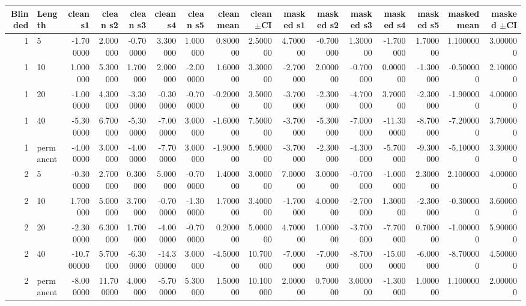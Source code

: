 \begin{tabular}{rlrrrrrrrrrrrrrr}
\toprule
Blinded & Length & clean s1 & clean s2 & clean s3 & clean s4 & clean s5 & clean mean & clean $\pm$CI & masked s1 & masked s2 & masked s3 & masked s4 & masked s5 & masked mean & masked $\pm$CI \\
\midrule
1 & 5 & -1.700000 & 2.000000 & -0.700000 & 3.300000 & 1.000000 & 0.800000 & 2.500000 & 4.700000 & -0.700000 & 1.300000 & -1.700000 & 1.700000 & 1.100000 & 3.000000 \\
1 & 10 & 1.000000 & 5.300000 & 1.700000 & 2.000000 & -2.000000 & 1.600000 & 3.300000 & -2.700000 & 2.000000 & -0.700000 & 0.000000 & -1.300000 & -0.500000 & 2.100000 \\
1 & 20 & -1.000000 & 4.300000 & -3.300000 & -0.300000 & -0.700000 & -0.200000 & 3.500000 & -3.700000 & -2.300000 & -4.700000 & 3.700000 & -2.300000 & -1.900000 & 4.000000 \\
1 & 40 & -5.300000 & 6.700000 & -5.300000 & -7.000000 & 3.000000 & -1.600000 & 7.500000 & -3.700000 & -5.300000 & -7.000000 & -11.300000 & -8.700000 & -7.200000 & 3.700000 \\
1 & permanent & -4.000000 & 3.000000 & -4.000000 & -7.700000 & 3.000000 & -1.900000 & 5.900000 & -3.700000 & -2.300000 & -4.300000 & -5.700000 & -9.300000 & -5.100000 & 3.300000 \\
2 & 5 & -0.300000 & 2.700000 & 0.300000 & 5.000000 & -0.700000 & 1.400000 & 3.000000 & 7.000000 & 3.000000 & -0.700000 & -1.000000 & 2.300000 & 2.100000 & 4.000000 \\
2 & 10 & 1.700000 & 5.000000 & 3.700000 & -0.700000 & -1.300000 & 1.700000 & 3.400000 & -1.700000 & 4.000000 & -2.700000 & 1.300000 & -2.300000 & -0.300000 & 3.600000 \\
2 & 20 & -2.300000 & 6.300000 & 1.700000 & -4.000000 & -0.700000 & 0.200000 & 5.000000 & 4.700000 & 1.000000 & -3.700000 & -7.700000 & 0.700000 & -1.000000 & 5.900000 \\
2 & 40 & -10.700000 & 5.700000 & -6.300000 & -14.300000 & 3.000000 & -4.500000 & 10.700000 & -7.000000 & -7.000000 & -8.700000 & -15.000000 & -6.000000 & -8.700000 & 4.500000 \\
2 & permanent & -8.000000 & 11.700000 & 4.000000 & -5.700000 & 5.300000 & 1.500000 & 10.100000 & 2.000000 & 0.700000 & 3.000000 & -1.300000 & 1.000000 & 1.100000 & 2.000000 \\
\bottomrule
\end{tabular}
